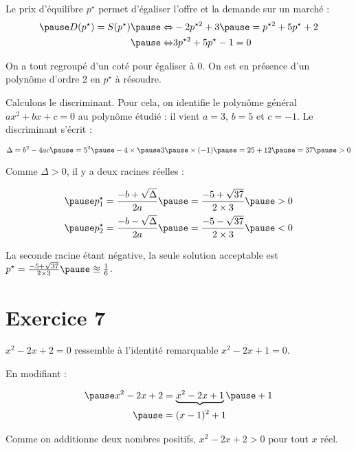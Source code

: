 \documentclass[9pt,professionalfonts,handout,hyperref]{beamer}
\begin{document}
\begin{frame}

Le prix d'équilibre $p^{\star}$ permet d'égaliser l'offre et la demande sur un marché :
	\[\begin{aligned}
\pause 	D(p^{\star}) = S(p^{\star})
\pause 	\Leftrightarrow&-2 p^{\star2}  + 3 \pause = p^{\star2} + 5p^{\star} +2\\
\pause 	\Leftrightarrow& 3 p^{\star2} + 5p^{\star} -1=0\\
	\end{aligned}\]

\pause On a tout regroupé d'un coté pour égaliser à 0. \pause On est en présence d'un polynôme d'ordre 2 en $p^{\star}$ à résoudre.\newline

\pause Calculons le discriminant. \pause Pour cela, on identifie le polynôme général $ax^{2} + bx +c=0$ au polynôme étudié \pause : il vient $a = 3$, $ b=5$ et $c=-1$. \pause Le discriminant s'écrit :

\[
\Delta = b^2 -4ac \pause = 5^2\pause -4\times \pause 3 \pause \times (-1) \pause = 25+12 \pause = 37 \pause >0
\]

\pause Comme $\Delta>0$, il y a deux racines réelles :

\[\begin{aligned}
\pause &p_1^{\star} = \frac{-b + \sqrt{\Delta}}{2a} \pause = \frac{-5 + \sqrt{37}}{2\times3}\pause >0\\
\pause &p_2^{\star} = \frac{-b - \sqrt{\Delta}}{2a} \pause = \frac{-5 - \sqrt{37}}{2\times3}\pause <0\\
\end{aligned}\]

\pause La seconde racine étant négative, la seule solution acceptable est $p^{\star} = \frac{-5 + \sqrt{37}}{2\times3} \pause \approxeq \frac{1}{6}$.

\end{frame}


\section{Exercice 7}

%
%

\begin{frame}

$x^2-2x+2 = 0$ ressemble à l'identité remarquable \pause $x^2-2x+1 = 0$.\newline

En modifiant :

\[\begin{aligned}
\pause x^2-2x+2
& = \underbrace{x^2-2x+1} \pause +1 \\
\pause & = (x-1)^2 +1 \\
\end{aligned}\]

Comme on additionne deux nombres positifs, $x^2-2x+2>0$ pour tout $x$ réel. \newline

\end{frame}
\end{document}
